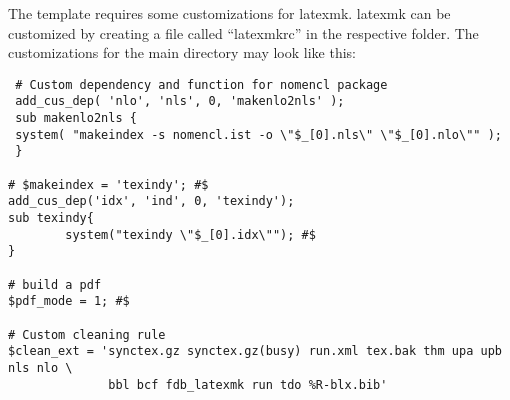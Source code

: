 The template requires some customizations for latexmk.
latexmk can be customized by creating a file called ``latexmkrc'' in the
respective folder.
The customizations for the main directory may look like this:
\begin{verbatim}
 # Custom dependency and function for nomencl package
 add_cus_dep( 'nlo', 'nls', 0, 'makenlo2nls' );
 sub makenlo2nls {
 system( "makeindex -s nomencl.ist -o \"$_[0].nls\" \"$_[0].nlo\"" );
 }

# $makeindex = 'texindy'; #$
add_cus_dep('idx', 'ind', 0, 'texindy');
sub texindy{
        system("texindy \"$_[0].idx\""); #$
}

# build a pdf
$pdf_mode = 1; #$

# Custom cleaning rule
$clean_ext = 'synctex.gz synctex.gz(busy) run.xml tex.bak thm upa upb nls nlo \
              bbl bcf fdb_latexmk run tdo %R-blx.bib'
\end{verbatim}
